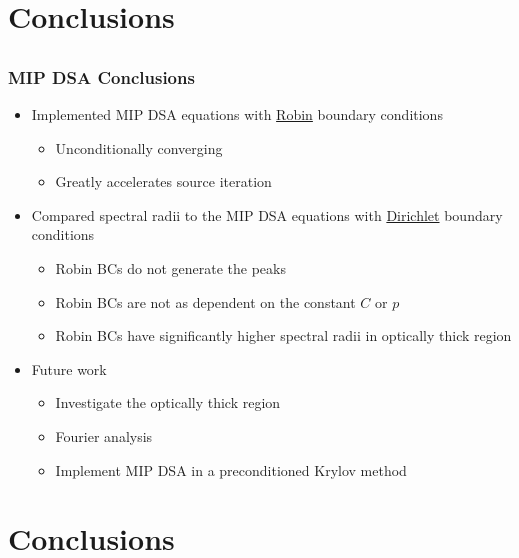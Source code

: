 \documentclass[compress,t]{beamer}
\begin{document}
\section{Conclusions}
\subsection{}

\begin{frame}
\frametitle{MIP DSA Conclusions}

\begin{itemize}
\item{Implemented MIP DSA equations with \ul{Robin} boundary conditions}
\begin{itemize}
\item{Unconditionally converging}
\item{Greatly accelerates source iteration}
\end{itemize}
\item{Compared spectral radii to the MIP DSA equations with \ul{Dirichlet} boundary conditions}
\begin{itemize}
\item{Robin BCs do not generate the peaks}
\item{Robin BCs are not as dependent on the constant $C$ or $p$}
\item{Robin BCs have significantly higher spectral radii in optically thick region}
\end{itemize}
\item{Future work}
\begin{itemize}
\item{Investigate the optically thick region}
\item{Fourier analysis}
\item{Implement MIP DSA in a preconditioned Krylov method}
\end{itemize}
\end{itemize}

\end{frame}

\section{Conclusions}
\end{document}
